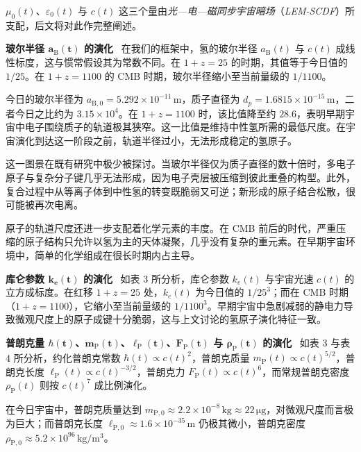\documentclass[12pt,leqno]{article}
\begin{document}
	\medskip
	$\mu_0(t)$、$\varepsilon_0(t)$ 与 $c(t)$ 这三个量由{\textit{光—电—磁同步宇宙暗场}}（\textit{LEM-SCDF}）所支配，后文将对此作完整阐述。
	
	
	\medskip
	\bigskip
	\textbf{玻尔半径 $\boldsymbol{a_{\scriptscriptstyle\mathrm{B}}(t)}$ 的演化}\,\,\,
	在我们的框架中，氢的玻尔半径 $a_{\scriptscriptstyle\mathrm{B}}(t)$ 与 $c(t)$ 成线性标度，这与惯常假设其为常数不同。在 $1+z=25$ 的时期，其值等于今日值的 $1/25$。在 $1+z=1100$ 的 CMB 时期，玻尔半径缩小至当前量级的 $1/1100$。
	
	\medskip
	今日的玻尔半径为 $a_{\scriptscriptstyle\mathrm{B},0}=5.292\times10^{-11}\,\mathrm{m}$，质子直径为 $d_p=1.6815\times10^{-15}\,\mathrm{m}$，二者今日之比约为 $3.15\times10^4$。在 $1+z=1100$ 时，该比值降至约 $28.6$，表明早期宇宙中电子围绕质子的轨道极其狭窄。这一比值是维持中性氢所需的最低尺度。在宇宙演化到达这一阶段之前，轨道半径过小，无法形成稳定的氢原子。
	
	\medskip
	这一图景在既有研究中极少被探讨。当玻尔半径仅为质子直径的数十倍时，多电子原子与复杂分子键几乎无法形成，因为电子壳层被压缩到彼此重叠的构型。此外，复合过程中从等离子体到中性氢的转变既脆弱又可逆；新形成的原子结合松散，很可能被再次电离。
	
	\medskip
	原子的轨道尺度还进一步支配着化学元素的丰度。在 CMB 前后的时代，严重压缩的原子结构只允许以氢为主的天体凝聚，几乎没有复杂的重元素。在早期宇宙环境中，简单的化学组成在很长时期内占主导。
	
	
	\medskip
	\bigskip
	\textbf{库仑参数 $\boldsymbol{k_e(t)}$ 的演化}\,\,\,
	如表 3 所分析，库仑参数 $k_e(t)$ 与宇宙光速 $c(t)$ 的立方成标度。在红移 $1+z=25$ 处，$k_e(t)$ 为今日值的 $1/25^3$；而在 CMB 时期（$1+z=1100$），它缩小至当前量级的 $1/1100^3$。早期宇宙中急剧减弱的静电力导致微观尺度上的原子成键十分脆弱，这与上文讨论的氢原子演化特征一致。
	
	
	\medskip
	\bigskip
	\textbf{普朗克量 $\boldsymbol{\hbar(t)}$、$\boldsymbol{m_{\scriptscriptstyle\mathrm{P}}(t)}$、$\boldsymbol{\ell_{\scriptscriptstyle\mathrm{P}}(t)}$、$\boldsymbol{F_{\scriptscriptstyle\mathrm{P}}(t)}$ 与 $\boldsymbol{\rho_{\scriptscriptstyle\mathrm{P}}(t)}$ 的演化}\,\,\,
	如表 3 与表 4 所分析，约化普朗克常数 $\hbar(t) \propto c(t)^{2}$，普朗克质量 $m_{\scriptscriptstyle\mathrm{P}}(t) \propto c(t)^{5/2}$，普朗克长度 $\ell_{\scriptscriptstyle\mathrm{P}}(t)\propto c(t)^{-3/2}$，普朗克力 $F_{\scriptscriptstyle\mathrm{P}}(t)\propto c(t)^{6}$，而常规普朗克密度 $\rho_{\scriptscriptstyle\mathrm{P}}(t)$ 则按 $c(t)^7$ 成比例演化。
	
	\medskip
	在今日宇宙中，普朗克质量达到 $m_{\scriptscriptstyle\mathrm{P,0}} \approx 2.2\times 10^{-8}\,\mathrm{kg} \approx 22\, \mathrm{\mu g}$，对微观尺度而言极为巨大；而普朗克长度 $\ell_{\scriptscriptstyle\mathrm{P},0} \approx 1.6\times 10^{-35}\,\mathrm{m}$ 仍极其微小，普朗克密度 $\rho_{\scriptscriptstyle\mathrm{P},0} \approx 5.2\times 10^{96}\,\mathrm{kg/m^3}$。
	
\end{document}
